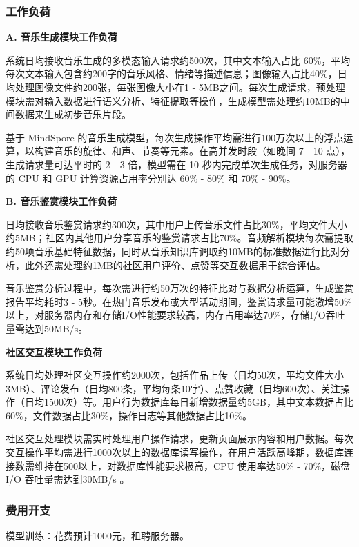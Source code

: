 \documentclass{base}
\begin{document}
\subsubsection{工作负荷}

\textbf{A. 音乐生成模块工作负荷}

系统日均接收音乐生成的多模态输入请求约500次，其中文本输入占比 60\%，平均每次文本输入包含约200字的音乐风格、情绪等描述信息；图像输入占比40\%，日均处理图像文件约200张，每张图像大小在1 - 5MB之间。每次生成请求，预处理模块需对输入数据进行语义分析、特征提取等操作，生成模型需处理约10MB的中间数据来生成初步音乐片段。​

基于 MindSpore 的音乐生成模型，每次生成操作平均需进行100万次以上的浮点运算，以构建音乐的旋律、和声、节奏等元素。在高并发时段（如晚间 7 - 10 点），生成请求量可达平时的 2 - 3 倍，模型需在 10 秒内完成单次生成任务，对服务器的 CPU 和 GPU 计算资源占用率分别达 60\% - 80\% 和 70\% - 90\%。​

\textbf{B. 音乐鉴赏模块工作负荷​}

日均接收音乐鉴赏请求约300次，其中用户上传音乐文件占比30\%，平均文件大小约5MB；社区内其他用户分享音乐的鉴赏请求占比70\%。音频解析模块每次需提取约50项音乐基础特征数据，同时从音乐知识库调取约10MB的标准数据进行比对分析，此外还需处理约1MB的社区用户评价、点赞等交互数据用于综合评估。​

音乐鉴赏分析过程中，每次需进行约50万次的特征比对与数据分析运算，生成鉴赏报告平均耗时3 - 5秒。在热门音乐发布或大型活动期间，鉴赏请求量可能激增50\%以上，对服务器内存和存储I/O性能要求较高，内存占用率达70\%，存储I/O吞吐量需达到50MB/s。​

\textbf{社区交互模块工作负荷}

系统日均处理社区交互操作约2000次，包括作品上传（日均50次，平均文件大小3MB）、评论发布（日均800条，平均每条10字）、点赞收藏（日均600次）、关注操作（日均1500次）等。用户行为数据库每日新增数据量约5GB，其中文本数据占比60\%，文件数据占比30\%，操作日志等其他数据占比10\%。​

社区交互处理模块需实时处理用户操作请求，更新页面展示内容和用户数据。每次交互操作平均需进行1000次以上的数据库读写操作，在用户活跃高峰期，数据库连接数需维持在500以上，对数据库性能要求极高，CPU 使用率达50\% - 70\%，磁盘 I/O 吞吐量需达到30MB/s 。

\subsubsection{费用开支}

模型训练：花费预计1000元，租聘服务器。
\end{document}
